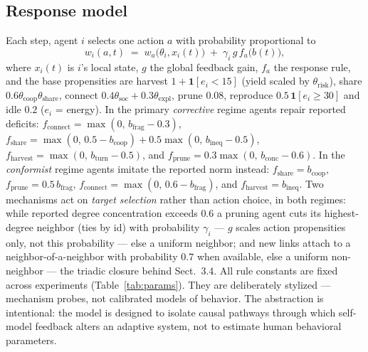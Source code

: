 \documentclass{svproc}
\begin{document}
\subsection{Response model}
Each step, agent $i$ selects one action $a$ with probability proportional to
\begin{equation}
w_i(a,t) \;=\; w_a\big(\theta_i, x_i(t)\big) \;+\; \gamma_i\, g\, f_a\big(b(t)\big),
\label{eq:response}
\end{equation}
where $x_i(t)$ is $i$'s local state, $g$ the global feedback gain, $f_a$ the
response rule, and the
base propensities are harvest $1+\mathbf{1}[e_i<15]$ (yield scaled by
$\theta_{\mathrm{risk}}$), share
$0.6\theta_{\mathrm{coop}}\theta_{\mathrm{share}}$, connect
$0.4\theta_{\mathrm{soc}}+0.3\theta_{\mathrm{expl}}$, prune $0.08$, reproduce
$0.5\,\mathbf{1}[e_i\geq30]$ and idle $0.2$ ($e_i$ = energy).
In the primary \emph{corrective} regime agents repair reported deficits:
$f_{\mathrm{connect}} = \max(0,\, b_{\mathrm{frag}}-0.3)$,
$f_{\mathrm{share}} = \max(0,\, 0.5-b_{\mathrm{coop}}) + 0.5\max(0,\,
b_{\mathrm{ineq}}-0.5)$,
$f_{\mathrm{harvest}} = \max(0,\, b_{\mathrm{turn}}-0.5)$, and
$f_{\mathrm{prune}} = 0.3\max(0,\, b_{\mathrm{conc}}-0.6)$.
In the \emph{conformist} regime agents imitate the reported norm instead:
$f_{\mathrm{share}} = b_{\mathrm{coop}}$,
$f_{\mathrm{prune}} = 0.5\, b_{\mathrm{frag}}$,
$f_{\mathrm{connect}} = \max(0,\, 0.6-b_{\mathrm{frag}})$, and
$f_{\mathrm{harvest}} = b_{\mathrm{ineq}}$. Two mechanisms act on \emph{target
selection} rather than action choice, in both regimes: while reported degree
concentration exceeds $0.6$ a pruning agent cuts its highest-degree neighbor
(ties by id) with probability $\gamma_i$ --- $g$ scales action propensities
only, not this probability --- else a uniform neighbor; and new links attach
to a neighbor-of-a-neighbor with probability $0.7$ when available, else a
uniform non-neighbor --- the triadic closure behind Sect.~3.4. All rule
constants are fixed across experiments (Table~\ref{tab:params}). They are deliberately
stylized --- mechanism probes, not calibrated models of behavior. The
abstraction is intentional: the model is designed to isolate causal pathways
through which self-model feedback alters an adaptive system, not to estimate
human behavioral parameters.
\end{document}
